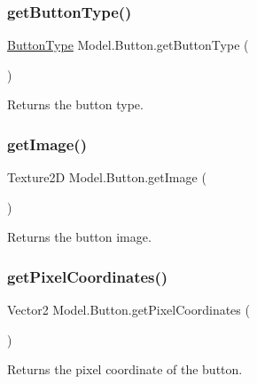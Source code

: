 \subsubsection{\texorpdfstring{get\+Button\+Type()}{getButtonType()}}
{\footnotesize\ttfamily \hyperlink{namespace_model_ac76b3489c9d704f49912608bd36cd0e7}{Button\+Type} Model.\+Button.\+get\+Button\+Type (\begin{DoxyParamCaption}{ }\end{DoxyParamCaption})\hspace{0.3cm}{\ttfamily [inline]}}

Returns the button type. \hypertarget{class_model_1_1_button_a5de177a3bb153c7679d2b051c45563d2}{}\label{class_model_1_1_button_a5de177a3bb153c7679d2b051c45563d2} 
\subsubsection{\texorpdfstring{get\+Image()}{getImage()}}
{\footnotesize\ttfamily Texture2D Model.\+Button.\+get\+Image (\begin{DoxyParamCaption}{ }\end{DoxyParamCaption})\hspace{0.3cm}{\ttfamily [inline]}}

Returns the button image. \hypertarget{class_model_1_1_button_a85c03ed625cb7b0a71acaff71c0b9720}{}\label{class_model_1_1_button_a85c03ed625cb7b0a71acaff71c0b9720} 
\subsubsection{\texorpdfstring{get\+Pixel\+Coordinates()}{getPixelCoordinates()}}
{\footnotesize\ttfamily Vector2 Model.\+Button.\+get\+Pixel\+Coordinates (\begin{DoxyParamCaption}{ }\end{DoxyParamCaption})\hspace{0.3cm}{\ttfamily [inline]}}

Returns the pixel coordinate of the button. \hypertarget{class_model_1_1_button_a133007487f6d8537f87c89070655f384}{}\label{class_model_1_1_button_a133007487f6d8537f87c89070655f384} 
